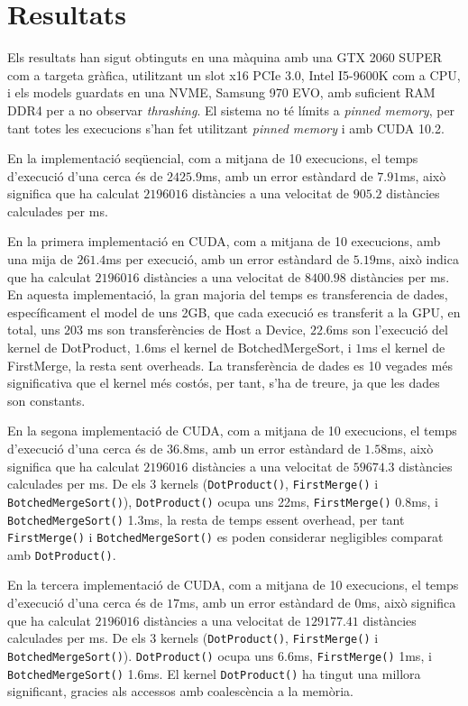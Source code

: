 \documentclass[catalan,10pt,a4paper]{article}
\begin{document}
\section*{Resultats}\label{sec:results}

Els resultats han sigut obtinguts en una màquina amb una GTX 2060 SUPER com a targeta gràfica, utilitzant un slot x16 PCIe 3.0, Intel I5-9600K com a CPU, i els models guardats en una NVME, Samsung 970 EVO, amb suficient RAM DDR4 per a no observar \textit{thrashing}. El sistema no té límits a \textit{pinned memory}, per tant totes les execucions s'han fet utilitzant \textit{pinned memory} i amb CUDA 10.2.


En la implementació seqüencial, com a mitjana de 10 execucions, el temps d'execució d'una cerca és de $2425.9$ms, amb un error estàndard de $7.91$ms, això significa que ha calculat $2196016$ distàncies a una velocitat de $905.2$ distàncies calculades per ms. 

En la primera implementació en CUDA, com a mitjana de 10 execucions, amb una mija de $261.4$ms per execució, amb un error estàndard de $5.19$ms, això indica que ha calculat $2196016$ distàncies a una velocitat de $8400.98$ distàncies per ms. En aquesta implementació, la gran majoria del temps es transferencia de dades, específicament el model de uns 2GB, que cada execució es transferit a la GPU, en total, uns $203$ ms son transferències de Host a Device, $22.6$ms son l'execució del kernel de DotProduct, $1.6$ms el kernel de BotchedMergeSort, i $1$ms el kernel de FirstMerge, la resta sent overheads. La transferència de dades es 10 vegades més significativa que el kernel més costós, per tant, s'ha de treure, ja que les dades son constants.


En la segona implementació de CUDA, com a mitjana de 10 execucions, el temps d'execució d'una cerca és de $36.8$ms, amb un error estàndard de $1.58$ms, això significa que ha calculat $2196016$ distàncies a una velocitat de $59674.3$ distàncies calculades per ms. De els 3 kernels (\verb|DotProduct()|, \verb|FirstMerge()| i \verb|BotchedMergeSort()|), \verb|DotProduct()| ocupa uns 22ms, \verb|FirstMerge()| 0.8ms, i \verb|BotchedMergeSort()| 1.3ms, la resta de temps essent overhead, per tant \verb|FirstMerge()| i \verb|BotchedMergeSort()| es poden considerar negligibles comparat amb \verb|DotProduct()|.

En la tercera implementació de CUDA, com a mitjana de 10 execucions, el temps d'execució d'una cerca és de $17$ms, amb un error estàndard de $0$ms, això significa que ha calculat $2196016$ distàncies a una velocitat de $129177.41$ distàncies calculades per ms. De els 3 kernels (\verb|DotProduct()|, \verb|FirstMerge()| i \verb|BotchedMergeSort()|). \verb|DotProduct()| ocupa uns 6.6ms, \verb|FirstMerge()| 1ms, i \verb|BotchedMergeSort()| 1.6ms. El kernel \verb|DotProduct()| ha tingut una millora significant, gracies als accessos amb coalescència a la memòria.
\end{document}

